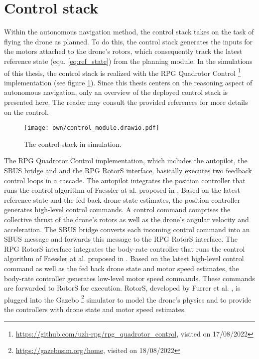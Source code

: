 \section{Control stack}
Within the autonomous navigation method, 
the control stack takes on the task of 
flying the drone as planned.
To do this, the control stack
generates the inputs for the motors attached to the drone's rotors,
which consequently track the latest reference state
(equ. \ref{eq:ref_state})
from the planning module.
In the simulations of this thesis,
the control stack is realized with the RPG Quadrotor Control \footnote{
        \url{https://github.com/uzh-rpg/rpg_quadrotor_control}, visited on 17/08/2022
} implementation
(see figure \ref{fig:control_module}).
Since this thesis centers on the reasoning aspect of autonomous navigation, 
only an overview of the deployed control stack is presented here.
The reader may consult the provided references for more details
on the control.

\begin{figure}
    \centering
    \texttt{[image: own/control\_module.drawio.pdf]}
    \caption[
        The control stack in simulation.
    ]{
        The control stack in simulation.
        \label{fig:control_module}}
\end{figure}

The RPG Quadrotor Control implementation,
which includes the autopilot, the SBUS bridge and and the RPG RotorS interface,
basically executes two feedback control loops in a cascade.
The autopilot integrates the position controller 
that runs the control algorithm of Faessler at al. proposed in \cite{Faessler2018}.
Based on the latest reference state and the fed back drone state estimates,
the position controller generates high-level control commands.
A control command comprises 
the collective thrust of the drone's rotors 
as well as the drone's angular velocity and acceleration.
The SBUS bridge converts each incoming control command
into an SBUS message and forwards this message to the
RPG RotorS interface.
The RPG RotorS interface integrates the body-rate controller
that runs the control algorithm of Faessler at al. proposed in \cite{Faessler2017}.
Based on the latest high-level control command 
as well as the fed back drone state and motor speed estimates,
the body-rate controller generates low-level motor speed commands.
These commands are forwarded to RotorS for execution.
RotorS, developed by Furrer et al. \cite{Furrer2016},
is plugged into the Gazebo \footnote{
    \url{https://gazebosim.org/home}, visited on 18/08/2022
}
simulator to model the drone's physics 
and to provide the controllers with
drone state and motor speed estimates.

